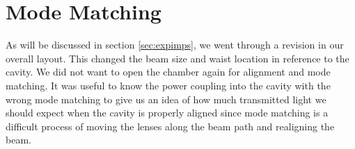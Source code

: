%
%
%
%
%

\section{Mode Matching}
As will be discussed in section
\ref{sec:expimps}, we went through a revision in our overall layout.
This changed the beam size and waist location in reference to the cavity.
We did not want to open the chamber again for alignment and mode matching.
It was useful to know the power coupling into the cavity with the wrong
mode matching to give us an idea of how much transmitted light we should
expect when the cavity is properly aligned since mode matching is a difficult
process of moving the lenses along the beam path and realigning the beam.

